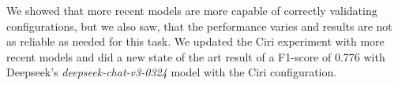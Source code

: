 We showed that more recent models are more capable of correctly validating configurations, but we also saw, that the performance varies and results are not as reliable as needed for this task. We updated the Ciri experiment with more recent models and did a new state of the art result of a F1-score of 0.776 with Deepseek's \textit{deepseek-chat-v3-0324} model with the Ciri configuration.
